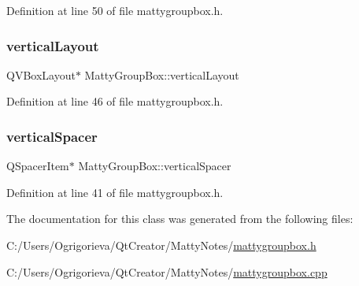 Definition at line 50 of file mattygroupbox.\+h.

\hypertarget{classMattyGroupBox_a2fc280283ef68a61828fe26007c949f1}{}\label{classMattyGroupBox_a2fc280283ef68a61828fe26007c949f1} 
\subsubsection{\texorpdfstring{vertical\+Layout}{verticalLayout}}
{\footnotesize\ttfamily Q\+V\+Box\+Layout$\ast$ Matty\+Group\+Box\+::vertical\+Layout\hspace{0.3cm}{\ttfamily [private]}}



Definition at line 46 of file mattygroupbox.\+h.

\hypertarget{classMattyGroupBox_ae622d8330b00272995af1d41ce037b4c}{}\label{classMattyGroupBox_ae622d8330b00272995af1d41ce037b4c} 
\subsubsection{\texorpdfstring{vertical\+Spacer}{verticalSpacer}}
{\footnotesize\ttfamily Q\+Spacer\+Item$\ast$ Matty\+Group\+Box\+::vertical\+Spacer\hspace{0.3cm}{\ttfamily [private]}}



Definition at line 41 of file mattygroupbox.\+h.



The documentation for this class was generated from the following files\+:\begin{DoxyCompactItemize}
\item 
C\+:/\+Users/\+Ogrigorieva/\+Qt\+Creator/\+Matty\+Notes/\hyperlink{mattygroupbox_8h}{mattygroupbox.\+h}\item 
C\+:/\+Users/\+Ogrigorieva/\+Qt\+Creator/\+Matty\+Notes/\hyperlink{mattygroupbox_8cpp}{mattygroupbox.\+cpp}\end{DoxyCompactItemize}
